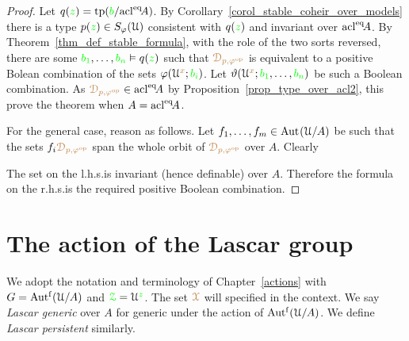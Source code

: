 \begin{proof}
  Let $q({\color{green} z})={\rm tp}({\color{green} b}/{\rm acl}^{{\rm eq}}\!A)$.
  By Corollary~\ref{corol_stable_coheir_over_models} there is a type $p({\color{green} z})\in S_\varphi(\EuScript U)$ consistent with $q({\color{green} z})$ and invariant over ${\rm acl}^{{\rm eq}}\!A$.
  By Theorem~\ref{thm_def_stable_formula}, with the role of the two sorts reversed, there are some ${\color{green} b_1},\dots,{\color{green} b_n}\vDash q({\color{green} z})$ such that ${\color{brown}\EuScript D_{p,\varphi^{\rm op}}}$ is equivalent to a positive Bolean combination of the sets $\varphi(\EuScript U^{\color{brown} x};{\color{green} b_i})$.
  Let $\vartheta(\EuScript U^{\color{brown} x};{\color{green} b_1},\dots,{\color{green} b_n})$ be such a Boolean combination.
  As ${\color{brown}\EuScript D_{p,\varphi^{\rm op}}}\in{\rm acl}^{{\rm eq}}\!A$ by Proposition~\ref{prop_type_over_acl2}, this prove the theorem when $A={\rm acl}^{{\rm eq}}\!A$.

  For the general case, reason as follows.
  Let $f_1,\dots,f_m\in{\rm Aut\kern.15ex}(\EuScript U/A)$ be such that the sets $f_i{\color{brown}\EuScript D_{p,\varphi^{\rm op}}}$ span the whole orbit of ${\color{brown}\EuScript D_{p,\varphi^{\rm op}}}$ over $A$.
  Clearly


  The set on the l.h.s.\@ is invariant (hence definable) over $A$.
  Therefore the formula on the r.h.s.\@ is the required positive Boolean combination.
\end{proof}

\section{The action of the Lascar group}

\def\medrel#1{\parbox[t]{6ex}{$\displaystyle\hfil #1$}}
\def\ceq#1#2#3{\parbox{10ex}{$\displaystyle #1$}\medrel{#2}$\displaystyle  #3$}

We adopt the notation and terminology of Chapter~\ref{actions} with $G=\mbox{Aut$^{\rm f}$}(\EuScript U/A)$ and ${\color{green}\EuScript Z}=\EuScript U^{\color{green} z}$.
The set ${\color{brown}\EuScript X}$ will specified in the context.
We say \emph{Lascar generic\/} over $A$ for generic under the action of $\mbox{Aut$^{\rm f}$}(\EuScript U/A)$.
We define \emph{Lascar persistent\/} similarly.

